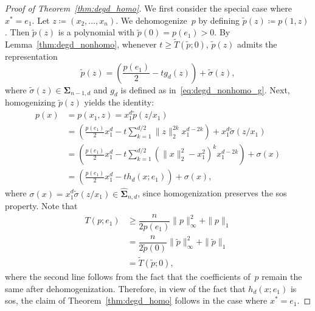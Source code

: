 \documentclass[10pt,a4paper]{amsart}
\newcommand{\HSOS}{\widehat{\mathbf{\Sigma}}}
\newcommand{\SOS}{\mathbf{\Sigma}}
\newcommand{\defeq}{\coloneq}
\begin{document}
\begin{proof}[Proof of Theorem~\ref{thm:degd_homo}]
We first consider the special case where $x^*=e_1$. Let $z\defeq(x_2,\ldots,x_n)$. We dehomogenize~$p$ by defining $\tilde{p}(z)\defeq p(1,z)$. Then $\tilde{p}(z)$ is a polynomial with $\tilde{p}(0)=p(e_1)>0$. 
By Lemma~\ref{thm:degd_nonhomo}, whenever $t\ge \tilde{T}(\tilde{p};0)$, $\tilde{p}(z)$ admits the representation
\[\tilde{p}(z)=\left(\frac{p(e_1)}{2}-tg_d(z)\right)+\tilde{\sigma}(z),\]
where $\tilde{\sigma}(z)\in\SOS_{n-1,d}$ and $g_d$ is defined as in~\eqref{eq:degd_nonhomo_g}. 
Next, homogenizing $\tilde{p}(z)$ yields the identity:
\[\begin{aligned}
p(x)&=p(x_1,z)=x_1^d \tilde{p}(z/x_1)\\
&=\left(\frac{p(e_1)}{2}x_1^d-t\sum\limits_{k=1}^{d/2}\|z\|_2^{2k}x_1^{d-2k}\right)+x_1^d \tilde{\sigma}(z/x_1)\\
&=\left(\frac{p(e_1)}{2}x_1^d-t\sum\limits_{k=1}^{d/2}(\|x\|_2^2-x_1^2)^{k}x_1^{d-2k}\right)+\sigma(x)\\
&=\left(\frac{p(e_1)}{2}x_1^d-th_d(x;e_1)\right)+\sigma(x),
\end{aligned}\]
where $\sigma(x)=x_1^d \tilde{\sigma}(z/x_1)\in\HSOS_{n,d}$, since homogenization preserves the sos property. Note that
\[\begin{aligned}
T(p;e_1)&\ge \dfrac{n}{2p(e_1)}\|p\|_{\infty}^2+\|p\|_1\\
&= \dfrac{n}{2\tilde{p}(0)}\|\tilde{p}\|^2_{\infty} + \|\tilde{p}\|_1\\
&=\tilde{T}(\tilde{p};0),
\end{aligned}\]
where the second line follows from the fact that the coefficients of~$p$ remain the same after dehomogenization. 
Therefore, in view of the fact that $h_d(x;e_1)$ is sos, the claim of Theorem~\ref{thm:degd_homo} follows in the case where $x^*=e_1$.



\end{proof}
\end{document}
